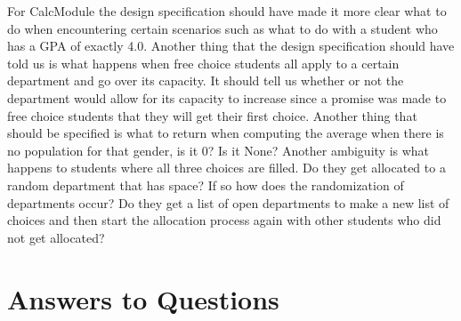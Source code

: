 \documentclass[12pt]{article}
\begin{document}
For CalcModule the design specification should have made it more clear what to do when encountering certain scenarios such as what to do with
a student who has a GPA of exactly 4.0. Another thing that the design specification should have told us is what happens when free choice
students all apply to a certain department and go over its capacity. It should tell us whether or not the department would allow for its 
capacity to increase since a promise was made to free choice students that they will get their first choice. Another thing that should be
specified is what to return when computing the average when there is no population for that gender, is it 0? Is it None? Another ambiguity
is what happens to students where all three choices are filled. Do they get allocated to a random department that has space? If so how does the
randomization of departments occur? Do they get a list of open departments to make a new list of choices and then start the allocation process 
again with other students who did not get allocated?

\section{Answers to Questions}
\end{document}
